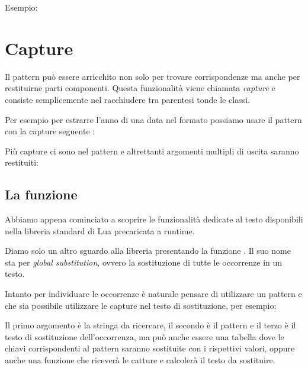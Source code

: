 Esempio:

\section{Capture}
\label{secFondCapture}

Il pattern può essere arricchito non solo per trovare corrispondenze ma anche
per restituirne parti componenti. Questa funzionalità viene chiamata
\emph{capture} e consiste semplicemente nel racchiudere tra parentesi tonde le
classi.

Per esempio per estrarre l'anno di una data nel formato 
possiamo usare il pattern con la capture seguente
:

Più capture ci sono nel pattern e altrettanti argomenti multipli di uscita
saranno restituiti:



\subsection{La funzione }
\label{secFondGsub}

Abbiamo appena cominciato a scoprire le funzionalità dedicate al testo
disponibili nella libreria standard di Lua precaricata a runtime.

Diamo solo un altro sguardo alla libreria presentando la funzione
. Il suo nome sta per \emph{global substitution}, ovvero
la sostituzione di tutte le occorrenze in un testo.

Intanto per individuare le occorrenze è naturale pensare di utilizzare un
pattern e che sia possibile utilizzare le capture nel testo di sostituzione,
per esempio:

Il primo argomento è la stringa da ricercare, il secondo è il pattern e il
terzo è il testo di sostituzione dell'occorrenza, ma può anche essere una
tabella dove le chiavi corrispondenti al pattern saranno sostituite con
i rispettivi valori, oppure anche una funzione che riceverà le catture e
calcolerà il testo da sostituire.

